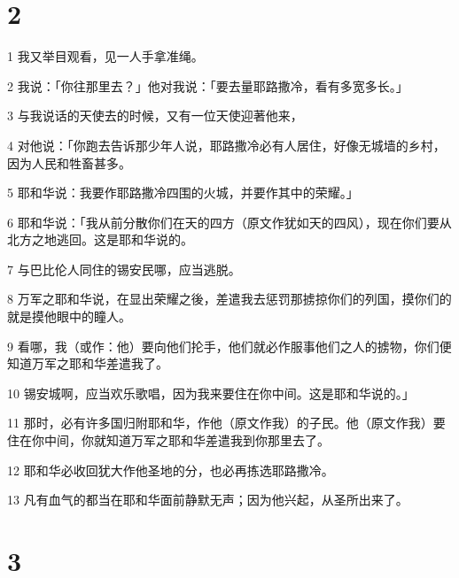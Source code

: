 \chapter{2}

\par 1 我又举目观看，见一人手拿准绳。
\par 2 我说：「你往那里去？」他对我说：「要去量耶路撒冷，看有多宽多长。」
\par 3 与我说话的天使去的时候，又有一位天使迎著他来，
\par 4 对他说：「你跑去告诉那少年人说，耶路撒冷必有人居住，好像无城墙的乡村，因为人民和牲畜甚多。
\par 5 耶和华说：我要作耶路撒冷四围的火城，并要作其中的荣耀。」
\par 6 耶和华说：「我从前分散你们在天的四方（原文作犹如天的四风），现在你们要从北方之地逃回。这是耶和华说的。
\par 7 与巴比伦人同住的锡安民哪，应当逃脱。
\par 8 万军之耶和华说，在显出荣耀之後，差遣我去惩罚那掳掠你们的列国，摸你们的就是摸他眼中的瞳人。
\par 9 看哪，我（或作：他）要向他们抡手，他们就必作服事他们之人的掳物，你们便知道万军之耶和华差遣我了。
\par 10 锡安城啊，应当欢乐歌唱，因为我来要住在你中间。这是耶和华说的。」
\par 11 那时，必有许多国归附耶和华，作他（原文作我）的子民。他（原文作我）要住在你中间，你就知道万军之耶和华差遣我到你那里去了。
\par 12 耶和华必收回犹大作他圣地的分，也必再拣选耶路撒冷。
\par 13 凡有血气的都当在耶和华面前静默无声；因为他兴起，从圣所出来了。

\chapter{3}

